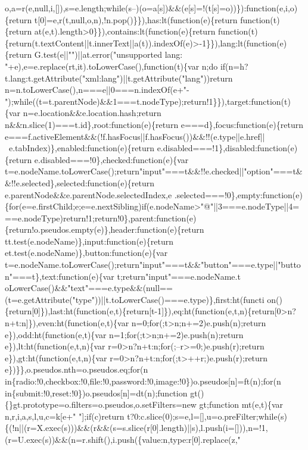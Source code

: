 \begin{DoxyCode}
{       o,a=r(e,null,i,[]),s=e.length;while(s--)(o=a[s])&&(e[s]=!(t[s]=o))\}):function(e,i,o)\{return
       t[0]=e,r(t,null,o,n),!n.pop()\}\}),has:lt(function(e)\{return function(t)\{return
       at(e,t).length>0\}\}),contains:lt(function(e)\{return function(t)\{return(t.textContent||t.innerText||a(t)).indexOf(e)>-1\}\}),lang:lt(function(e)\{return
       G.test(e||"")||at.error("unsupported lang: "+e),e=e.replace(rt,it).toLowerCase(),function(t)\{var n;do
       if(n=h?t.lang:t.getAttribute("xml:lang")||t.getAttribute("lang"))return
       n=n.toLowerCase(),n===e||0===n.indexOf(e+"-");while((t=t.parentNode)&&1===t.nodeType);return!1\}\}),target:function(t)\{var
       n=e.location&&e.location.hash;return n&&n.slice(1)===t.id\},root:function(e)\{return e===d\},focus:function(e)\{return
       e===f.activeElement&&(!f.hasFocus||f.hasFocus())&&!!(e.type||e.href||~e.tabIndex)\},enabled:function(e)\{return
       e.disabled===!1\},disabled:function(e)\{return e.disabled===!0\},checked:function(e)\{var
       t=e.nodeName.toLowerCase();return"input"===t&&!!e.checked||"option"===t&&!!e.selected\},selected:function(e)\{return
       e.parentNode&&e.parentNode.selectedIndex,e
      .selected===!0\},empty:function(e)\{for(e=e.firstChild;e;e=e.nextSibling)if(e.nodeName>"@"||3===e.nodeType||4===e.nodeType)return!1;return!0\},parent:function(e)\{return!o.pseudos.empty(e)\},header:function(e)\{return
       tt.test(e.nodeName)\},input:function(e)\{return et.test(e.nodeName)\},button:function(e)\{var
       t=e.nodeName.toLowerCase();return"input"===t&&"button"===e.type||"button"===t\},text:function(e)\{var
       t;return"input"===e.nodeName.t
      oLowerCase()&&"text"===e.type&&(null==(t=e.getAttribute("type"))||t.toLowerCase()===e.type)\},first:ht(functi
      on()\{return[0]\}),last:ht(function(e,t)\{return[t-1]\}),eq:ht(function(e,t,n)\{return[0>n?n+t:n]\}),even:ht(function(e,t)\{var n=0;for(;t>n;n+=2)e.push(n);return e\}),odd:ht(function(e,t)\{var
       n=1;for(;t>n;n+=2)e.push(n);return e\}),lt:ht(function(e,t,n)\{var r=0>n?n+t:n;for(;--r>=0;)e.push(r);return e\}),gt:ht(function(e,t,n)\{var
       r=0>n?n+t:n;for(;t>++r;)e.push(r);return e\})\}\},o.pseudos.nth=o.pseudos.eq;for(n
       in\{radio:!0,checkbox:!0,file:!0,password:!0,image:!0\})o.pseudos[n]=ft(n);for(n in\{submit:!0,reset:!0\})o.pseudos[n]=dt(n);function
       gt()\{\}gt.prototype=o.filters=o.pseudos,o.setFilters=new gt;function mt(e,t)\{var n,r,i,a,s,l,u,c=k[e+"
       "];if(c)return
       t?0:c.slice(0);s=e,l=[],u=o.preFilter;while(s)\{(!n||(r=X.exec(s)))&&(r&&(s=s.slice(r[0].length)||s),l.push(i=[])),n=!1,(r=U.exec(s))&&(n=r.shift(),i.push(\{value:n,type:r[0].replace(z,"
}
\end{DoxyCode}
